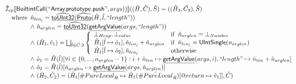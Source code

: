 \documentclass{article}
\makeatletter
\newcommand{\SF}[1]{\mbox{\textsf{#1}}}
\newcommand{\wherec}[1]{{\rm where}\begin{array}[t]{l}#1\end{array}}
\newcommand{\ifc}[1]{{\rm if}\begin{array}[t]{l}#1\end{array}}
\newcommand{\owc}{{\rm otherwise}}
\newcommand{\aI}{\hat{\mathcal{I}}}
\newcommand{\lbr}{\llbracket}
\newcommand{\rbr}{\rrbracket}
\newcommand{\hf}[1]{\underline{\sf #1}}
\newcommand{\ahf}[1]{\widehat{\underline{\sf #1}}}
\newcommand{\varprop}[1]{@#1}
\newcommand{\avarloc}[1]{\hat{\##1}}
\makeatother
\begin{document}
\[\begin{array}{ll}
\aI _{cp}\lbr \SF{BuiltintCall}(``\SF{Array.prototype.push}",args))\rbr((\hat{H},\hat{C}), \hat{S})
  = ((\hat{H}_3, \hat{C_3}), \hat{S})\\
\quad\wherec{
  \hat{n}_{len_{\hat{l}}} = \ahf{toUInt32}(\ahf{Proto}(\hat{H}, \hat{l}, ``length"))\\
  \land\ \hat{n}_{arglen} = \ahf{toUInt32}(\hf{getArgValue}(args, ``length"))\\
  \land\ (\hat{H}_1, \hat{v}_1) =  \bigsqcup_{\hat{l} \in \hat{C}.2} \left\{\begin{array}{ll}
      \bot_{Heap}, \bot_{value} & \ifc{\hat{n}_{arglen} = \bot_{Number}}\\
      \hat{H}_1[\hat{l} \mapsto \hat{o}_1], \hat{n}_{len_{\hat{l}}} + \hat{n}_{arglen}  & \ifc{\hat{n}_{len_{\hat{l}}} = \SF{UIntSingle}(n_{arglen})}\\
      \hat{H}_1[\hat{l} \mapsto \hat{o}_2], \hat{n}_{len_{\hat{l}}}& \owc
    \end{array}\right.\\
  \land\ \hat{o}_1 = \hat{H}(\hat{l})[\forall i \in \{0,..., n_{arglen}-1\}: i + \hat{n}_{len} \mapsto \hf{getArgValue}(args, i), ``length" \mapsto \hat{n}_{len} + \hat{n}_{arglen}]\\
  \land\ \hat{o}_2 = \hat{H}(\hat{l})[\hat{n}_{arglen} 
    \mapsto \hf{getArgValue}(args, \hat{n}_{arglen})]\\
  \land\ (\hat{H}_2, \hat{C}_2) = 
      (\hat{H}_1[\avarloc{PureLocal}_R \mapsto \hat{H}_1(\avarloc{PureLocal}_R)[\varprop{return} \mapsto \hat{v}_1]], \hat{C})\\
  }\\
\\\\




\end{array}\]
\end{document}
